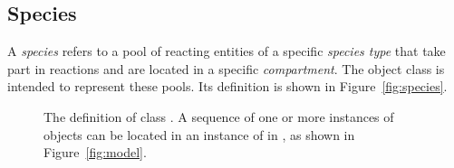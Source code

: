 \subsection{Species}
\label{sec:species}

A \emph{species} refers to a pool of reacting entities of a
specific \emph{species type} that take part in reactions and are
located in a specific \emph{compartment}.  The \Species
object class
is intended to represent these pools.  Its definition is
shown in Figure~\vref{fig:species}.  

\begin{figure}[htb]
  \centering
  \small
  \vspace*{-1.75ex}
  \vspace*{-1.5ex}
  \caption{The definition of class \Species.  A sequence
      of one or more instances of \Species objects can be located
      in an instance of \ListOfSpecies in \Model, as shown in
      Figure~\protect\ref{fig:model}.}
  \label{fig:species}
\end{figure}


